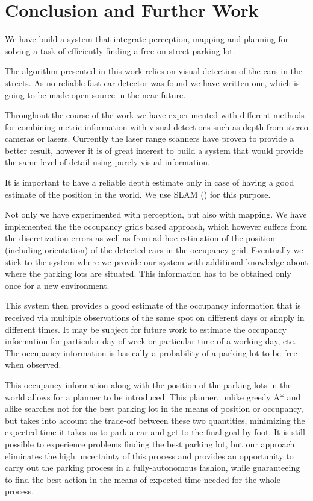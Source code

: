 
\chapter{Conclusion and Further Work} %
\label{cha:conclusion_and_further_work}
    We have build a system that integrate perception, mapping and planning for solving a task of efficiently finding a free on-street parking lot.

    The algorithm presented in this work relies on visual detection of the cars in the streets. As no reliable fast car detector was found we have written one, which is going to be made open-source in the near future.

    Throughout the course of the work we have experimented with different methods for combining metric information with visual detections such as depth from stereo cameras or lasers. Currently the laser range scanners have proven to provide a better result, however it is of great interest to build a system that would provide the same level of detail using purely visual information.

    It is important to have a reliable depth estimate only in case of having a good estimate of the position in the world. We use SLAM (\cite{stachniss11isrr,kuemmerle11auro,kretzschmar10ki}) for this purpose.

    Not only we have experimented with perception, but also with mapping. We have implemented the the occupancy grids based approach, which however suffers from the discretization errors as well as from ad-hoc estimation of the position (including orientation) of the detected cars in the occupancy grid. Eventually we stick to the system where we provide our system with additional knowledge about where the parking lots are situated. This information has to be obtained only once for a new environment.

    This system then provides a good estimate of the occupancy information that is received via multiple observations of the same spot on different days or simply in different times. It may be subject for future work to estimate the occupancy information for particular day of week or particular time of a working day, etc. The occupancy information is basically a probability of a parking lot to be free when observed.

    This occupancy information along with the position of the parking lots in the world allows for a planner to be introduced. This planner, unlike greedy A* and alike searches not for the best parking lot in the means of position or occupancy, but takes into account the trade-off between these two quantities, minimizing the expected time it takes us to park a car and get to the final goal by foot. It is still possible to experience problems finding the best parking lot, but our approach eliminates the high uncertainty of this process and provides an opportunity to carry out the parking process in a fully-autonomous fashion, while guaranteeing to find the best action in the means of expected time needed for the whole process.

